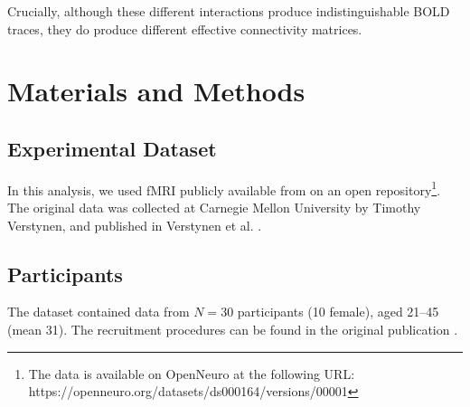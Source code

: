 \documentclass[10pt,letterpaper]{article}
\begin{document}
Crucially, although these different interactions produce indistinguishable BOLD traces, they do produce different effective connectivity matrices.


\section{Materials and Methods}

\subsection{Experimental Dataset}

In this analysis, we used fMRI publicly available from on an open repository\footnote{The data is available on OpenNeuro at the following URL:  https://openneuro.org/datasets/ds000164/versions/00001}. The original data was collected at Carnegie Mellon University by Timothy Verstynen, and published in Verstynen et al. \cite{Verstynen2014}.

\subsection{Participants}

The dataset contained data from $N=30$ participants (10 female), aged 21--45 (mean 31). The recruitment  procedures can be found in the original publication \cite{Verstynen2014}.
\end{document}

